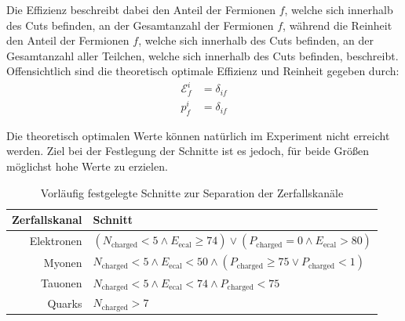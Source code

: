 Die Effizienz beschreibt dabei den Anteil der Fermionen $f$, welche sich innerhalb des Cuts befinden, an der Gesamtanzahl der Fermionen $f$, während die Reinheit den Anteil der Fermionen $f$, welche sich innerhalb des Cuts befinden, an der Gesamtanzahl aller Teilchen, welche sich innerhalb des Cuts befinden, beschreibt.\\

Offensichtlich sind die theoretisch optimale Effizienz und Reinheit gegeben durch:
\begin{align}
	\mathcal{E}_f^i&=\delta_{if}\\
	p_f^i&=\delta_{if}
\end{align}

Die theoretisch optimalen Werte können natürlich im Experiment nicht erreicht werden. Ziel bei der Festlegung der Schnitte ist es jedoch, für beide Größen möglichst hohe Werte zu erzielen.

\begin{table}
	\centering
	\begin{tabular}{r|p{10 cm}}
		\textbf{Zerfallskanal}&\textbf{Schnitt}\\\hline
		Elektronen&$\left(N_\text{charged}<5 \land E_\text{ecal}\geq74\right) \lor \left(P_\text{charged}=0\land E_\text{ecal}>80\right)$\\
		Myonen&$N_\text{charged}<5 \land E_\text{ecal}<50 \land \left(P_\text{charged}\geq 75 \lor P_\text{charged}<1\right)$\\
		Tauonen&$N_\text{charged}<5 \land E_\text{ecal}<74 \land P_\text{charged}< 75$\\
		Quarks&$N_\text{charged}>7$\\
	\end{tabular}
	\caption{Vorläufig festgelegte Schnitte zur Separation der Zerfallskanäle}
	\label{tab:cuts}
\end{table}

